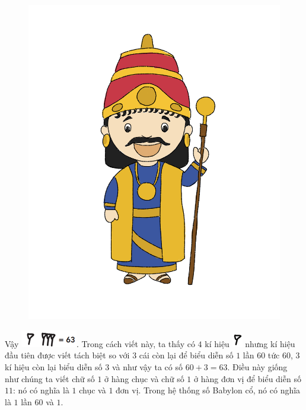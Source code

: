 	\vskip 0.1cm
	\begin{figure}
		\centering
		\vspace*{-15pt}
		\captionsetup{labelformat= empty, justification=centering}
		\includegraphics[width=1\linewidth]{20.12-pi.2}
		\vspace*{-25pt}
	\end{figure}
	\vskip 0.1cm
	Vậy \includegraphics[scale=0.85]{16.1}. Trong cách viết này, ta thấy có $4$ kí hiệu \includegraphics[scale=0.85]{15}   nhưng kí hiệu đầu tiên được viết tách biệt so với $3$ cái còn lại để biểu diễn số $1$ lần $60$ tức $60$, $3$ kí hiệu còn lại biểu diễn số $3$ và như vậy ta có số $60+3 =63$.
	\vskip 0.1cm
	Điều này giống như chúng ta viết chữ số $1$ ở hàng chục và chữ số $1$ ở hàng đơn vị để biểu diễn số $11$: nó có nghĩa là $1$ chục và $1$ đơn vị. Trong  hệ thống số  Babylon cổ, nó có nghĩa là $1$ lần $60$  và $1$.
